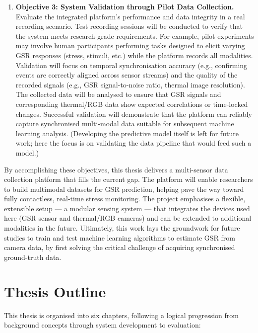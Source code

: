 \begin{enumerate}
  \item \textbf{Objective 3: System Validation through Pilot Data Collection.} Evaluate the integrated platform's performance and data integrity in a real recording scenario. Test recording sessions will be conducted to verify that the system meets research-grade requirements. For example, pilot experiments may involve human participants performing tasks designed to elicit varying GSR responses (stress, stimuli, etc.) while the platform records all modalities. Validation will focus on temporal synchronisation accuracy (e.g., confirming events are correctly aligned across sensor streams) and the quality of the recorded signals (e.g., GSR signal-to-noise ratio, thermal image resolution). The collected data will be analysed to ensure that GSR signals and corresponding thermal/RGB data show expected correlations or time-locked changes. Successful validation will demonstrate that the platform can reliably capture synchronised multi-modal data suitable for subsequent machine learning analysis. (Developing the predictive model itself is left for future work; here the focus is on validating the data pipeline that would feed such a model.)
\end{enumerate}

By accomplishing these objectives, this thesis delivers a multi-sensor data collection platform that fills the current gap. The platform will enable researchers to build multimodal datasets for GSR prediction, helping pave the way toward fully contactless, real-time stress monitoring. The project emphasises a flexible, extensible setup --- a modular sensing system --- that integrates the devices used here (GSR sensor and thermal/RGB cameras) and can be extended to additional modalities in the future. Ultimately, this work lays the groundwork for future studies to train and test machine learning algorithms to estimate GSR from camera data, by first solving the critical challenge of acquiring synchronised ground-truth data.

\section{Thesis Outline}
This thesis is organised into six chapters, following a logical progression from background concepts through system development to evaluation:

